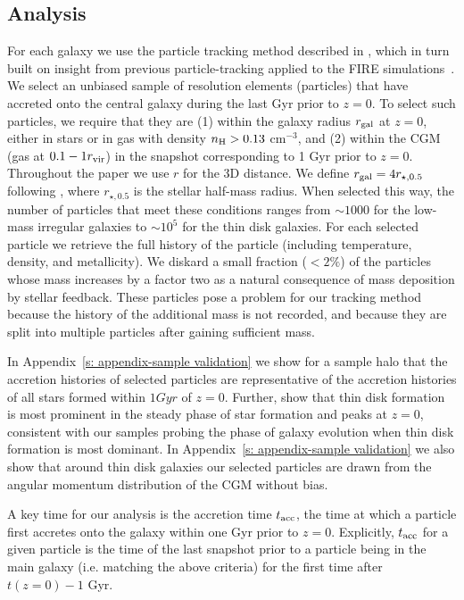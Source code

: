 \documentclass[fleqn,usenatbib]{mnras}
\newcommand{\tacc}{t_{\rm acc}}
\newcommand{\Rvir}{r_{\rm vir}}
\begin{document}
\subsection{Analysis}
\label{s: methods -- analysis}

For each galaxy we use the particle tracking method described in \cite{Hafen2019, Hafen2020}, which in turn built on insight from previous particle-tracking applied to the FIRE simulations~\citep{Angles-Alcazar2017}.
We select an unbiased sample of resolution elements (particles) that have accreted onto the central galaxy during the last Gyr prior to $z=0$.
To select such particles, we require that they are
(1) within the galaxy radius $r_{\rm gal}$ at $z=0$, either in stars or in gas with density  $n_{\rm H} > 0.13$ cm$^{-3}$, and
(2) within the CGM (gas at $0.1 - 1 \Rvir$) in the snapshot corresponding to 1 Gyr prior to $z=0$.
Throughout the paper we use $r$ for the 3D distance. 
We define $r_{\rm gal} = 4 r_{\star,0.5}$ following \cite{Hafen2019, Hafen2020}, where $r_{\star, 0.5}$ is the stellar half-mass radius.
When selected this way, the number of particles that meet these conditions ranges from $\sim 1000$ for the low-mass irregular galaxies to $\sim 10^5$ for the thin disk galaxies.
For each selected particle we retrieve the full history of the particle (including temperature, density, and metallicity). 
We diskard a small fraction ($<2\%$) of the particles whose mass increases by a factor two as a natural consequence of mass deposition by stellar feedback.
These particles pose a problem for our tracking method because the history of the additional mass is not recorded, and because they are split into multiple particles after gaining sufficient mass.

In Appendix~\ref{s: appendix-sample validation} we show for a sample halo that the accretion histories of selected particles are representative of the accretion histories of all stars formed within $1 Gyr$ of $z=0$.
Further, \cite{Yu2021} show that thin disk formation is most prominent in the steady phase of star formation and peaks at $z=0$, consistent with our samples probing the phase of galaxy evolution when thin disk formation is most dominant.
In Appendix~\ref{s: appendix-sample validation} we also show that around thin disk galaxies our selected particles are drawn from the angular momentum distribution of the CGM without bias.

A key time for our analysis is the accretion time $\tacc$, the time at which a particle first accretes onto the galaxy within one Gyr prior to $z=0$.
Explicitly, $\tacc$ for a given particle is the time of the last snapshot prior to a particle being in the main galaxy (i.e. matching the above criteria) for the first time after $t(z=0) - 1$ Gyr.
\end{document}
